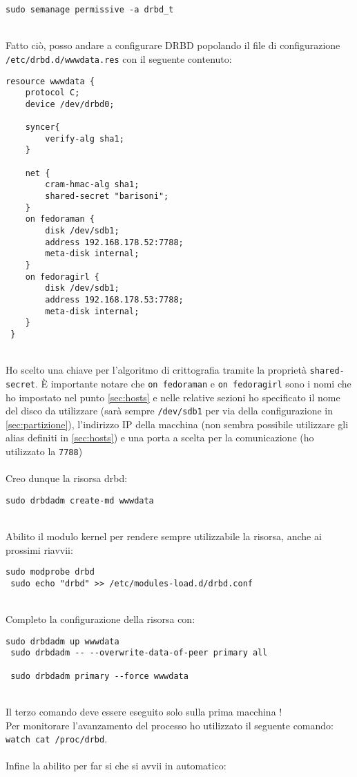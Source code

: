 \begin{lstlisting}[style=cmd]
 sudo semanage permissive -a drbd_t
\end{lstlisting}
\ \\
Fatto ci\`{o}, posso andare a configurare DRBD popolando il file di configurazione \lstinline[style=cmd]|/etc/drbd.d/wwwdata.res| con il seguente contenuto:

\begin{lstlisting}[style=cmd]
 resource wwwdata {
    protocol C;
    device /dev/drbd0;

    syncer{
        verify-alg sha1;
    }

    net {
        cram-hmac-alg sha1;
        shared-secret "barisoni";
    }
    on fedoraman {
        disk /dev/sdb1;
        address 192.168.178.52:7788;
        meta-disk internal;
    }
    on fedoragirl {
        disk /dev/sdb1;
        address 192.168.178.53:7788;
        meta-disk internal;
    }
 }
\end{lstlisting}
\ \\
Ho scelto una chiave per l'algoritmo di crittografia tramite la propriet\`{a} \lstinline[style=cmd]|shared-secret|. \`{E} importante notare che \lstinline[style=cmd]|on fedoraman| e \lstinline[style=cmd]|on fedoragirl| sono i nomi che ho impostato nel punto \autoref{sec:hosts} e nelle relative sezioni ho specificato il nome del disco da utilizzare (sar\`{a} sempre \lstinline[style=cmd]|/dev/sdb1| per via della configurazione in \autoref{sec:partizione}), l'indirizzo IP della macchina (non sembra possibile utilizzare gli alias definiti in \autoref{sec:hosts}) e una porta a scelta per la comunicazione (ho utilizzato la \lstinline[style=cmd]|7788|)\ \\
\ \\
Creo dunque la risorsa drbd:

\begin{lstlisting}[style=cmd]
 sudo drbdadm create-md wwwdata
\end{lstlisting}
\ \\
Abilito il modulo kernel per rendere sempre utilizzabile la risorsa, anche ai prossimi riavvii:

\begin{lstlisting}[style=cmd]
 sudo modprobe drbd
 sudo echo "drbd" >> /etc/modules-load.d/drbd.conf
\end{lstlisting}
\ \\
Completo la configurazione della risorsa con:

\begin{lstlisting}[style=cmd]
 sudo drbdadm up wwwdata
 sudo drbdadm -- --overwrite-data-of-peer primary all
 
 sudo drbdadm primary --force wwwdata
\end{lstlisting}
\ \\
Il terzo comando deve essere eseguito solo sulla prima macchina !\\
Per monitorare l'avanzamento del processo ho utilizzato il seguente comando: \lstinline[style=cmd]|watch cat /proc/drbd|.\\
\ \\
Infine la abilito per far si che si avvii in automatico:

